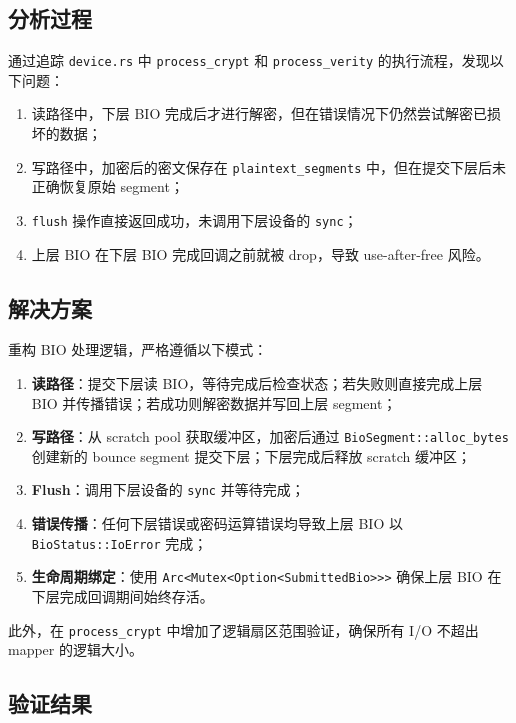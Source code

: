 \subsection{分析过程}

通过追踪 \texttt{device.rs} 中 \texttt{process\_crypt} 和 \texttt{process\_verity} 的执行流程，发现以下问题：
\begin{enumerate}
    \item 读路径中，下层 BIO 完成后才进行解密，但在错误情况下仍然尝试解密已损坏的数据；
    \item 写路径中，加密后的密文保存在 \texttt{plaintext\_segments} 中，但在提交下层后未正确恢复原始 segment；
    \item \texttt{flush} 操作直接返回成功，未调用下层设备的 \texttt{sync}；
    \item 上层 BIO 在下层 BIO 完成回调之前就被 drop，导致 use-after-free 风险。
\end{enumerate}

\subsection{解决方案}

重构 BIO 处理逻辑，严格遵循以下模式：

\begin{enumerate}
    \item \textbf{读路径}：提交下层读 BIO，等待完成后检查状态；若失败则直接完成上层 BIO 并传播错误；若成功则解密数据并写回上层 segment；
    \item \textbf{写路径}：从 scratch pool 获取缓冲区，加密后通过 \texttt{BioSegment::alloc\_bytes} 创建新的 bounce segment 提交下层；下层完成后释放 scratch 缓冲区；
    \item \textbf{Flush}：调用下层设备的 \texttt{sync} 并等待完成；
    \item \textbf{错误传播}：任何下层错误或密码运算错误均导致上层 BIO 以 \texttt{BioStatus::IoError} 完成；
    \item \textbf{生命周期绑定}：使用 \texttt{Arc<Mutex<Option<SubmittedBio>>>} 确保上层 BIO 在下层完成回调期间始终存活。
\end{enumerate}

此外，在 \texttt{process\_crypt} 中增加了逻辑扇区范围验证，确保所有 I/O 不超出 mapper 的逻辑大小。

\subsection{验证结果}

